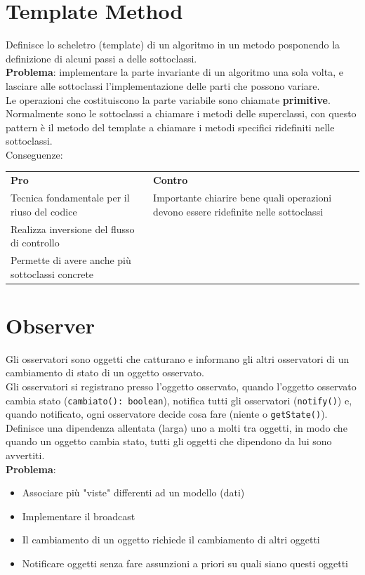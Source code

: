\documentclass[12pt, a4paper]{report}
\begin{document}
\section{Template Method}
Definisce lo scheletro (template) di un algoritmo in un metodo posponendo la definizione di alcuni passi a delle sottoclassi.\\
\textbf{Problema}: implementare la parte invariante di un algoritmo una sola volta, e lasciare alle sottoclassi l'implementazione delle parti che possono variare.\\
Le operazioni che costituiscono la parte variabile sono chiamate \textbf{primitive}. Normalmente sono le sottoclassi a chiamare i metodi delle superclassi, con questo pattern è il metodo del template a chiamare i metodi specifici ridefiniti nelle sottoclassi.\\
Conseguenze:
\begin{center}
    \begin{tabular}{| p{5cm} | p{12cm} |}
        \hline
        \textbf{Pro} & \textbf{Contro} \\
        Tecnica fondamentale per il riuso del codice & Importante chiarire bene quali operazioni devono essere ridefinite nelle sottoclassi \\
        \hline
        Realizza inversione del flusso di controllo & \\
        \hline
        Permette di avere anche più sottoclassi concrete & \\
        \hline
    \end{tabular}
\end{center}
\section{Observer}
Gli osservatori sono oggetti che catturano e informano gli altri osservatori di un cambiamento di stato di un oggetto osservato.\\
Gli osservatori si registrano presso l'oggetto osservato, quando l'oggetto osservato cambia stato (\texttt{cambiato(): boolean}), notifica tutti gli osservatori (\texttt{notify()}) e, quando notificato, ogni osservatore decide cosa fare (niente o \texttt{getState()}).\\
Definisce una dipendenza allentata (larga) uno a molti tra oggetti, in modo che quando un oggetto cambia stato, tutti gli oggetti che dipendono da lui sono avvertiti.\\
\textbf{Problema}:
\begin{itemize}
    \item Associare più "viste" differenti ad un  modello (dati)
    \item Implementare il broadcast
    \item Il cambiamento di un oggetto richiede il cambiamento di altri oggetti
    \item Notificare oggetti senza fare assunzioni a priori su quali siano questi oggetti
\end{itemize}
\end{document}
